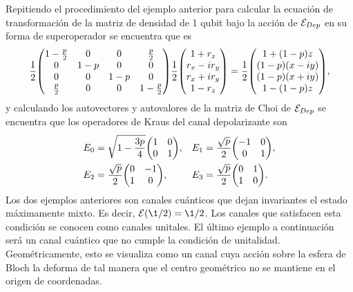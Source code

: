 Repitiendo el procedimiento del ejemplo anterior para calcular 
la ecuación de transformación de la matriz de densidad de
1 qubit bajo la acción de $\mathcal{E}_{Dep}$ en su forma de 
superoperador se encuentra que es
\begin{align}
\frac{1}{2}
\mqty(
1-\frac{p}{2} & 0 & 0 & \frac{p}{2} \\
0 & 1-p & 0 & 0 \\
0 & 0 & 1-p & 0 \\
\frac{p}{2} & 0 & 0 & 1-\frac{p}{2}
)
\frac{1}{2}
\mqty(
1+r_z\\r_x-ir_y\\r_x+ir_y\\1-r_z
)
=
\frac{1}{2}
\mqty(
1+\qty(1-p)z\\
\qty(1-p)\qty(x-i y)\\
\qty(1-p)\qty(x+i y)\\
1-\qty(1-p)z
),
\end{align}
y calculando los autovectores y autovalores de la matriz de Choi de
$\mathcal{E}_{Dep}$ se encuentra que los operadores de Kraus del 
canal depolarizante son
\begin{align}
E_0&=
\sqrt{1-\frac{3p}{4}}
\mqty(
1 & 0\\
0 & 1
),&
E_1&=
\frac{\sqrt{p}}{2}
\mqty(
-1 & 0\\
0 & 1
),\\
E_2&=
\frac{\sqrt{p}}{2}
\mqty(
0 & -1\\
1 & 0
), &
E_3&=
\frac{\sqrt{p}}{2}
\mqty(
0 & 1\\
1 & 0
).
\end{align}
Los dos ejemplos anteriores son canales cuánticos que dejan invariantes 
el estado máximamente mixto. Es decir, $\E(\1/2)=\1/2$. Los canales que
satisfacen esta condición se conocen como canales unitales. El 
último ejemplo a continuación será un canal cuántico que 
no cumple la condición de unitalidad. Geométricamente, esto
se visualiza como un canal cuya acción sobre la esfera de Bloch
la deforma de tal manera que el centro geométrico no se mantiene
en el origen de coordenadas.


